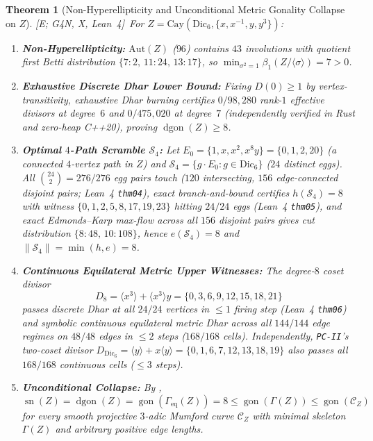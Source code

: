 \documentclass[11pt]{amsart}
\numberwithin{equation}{section}
\theoremstyle{plain}
\newtheorem{theorem}{Theorem}[section]
\theoremstyle{definition}\newtheorem{definition}[theorem]{Definition}
\theoremstyle{remark}\newtheorem{remark}[theorem]{Remark}
\newcommand{\calC}{\mathcal{C}}
\newcommand{\calS}{\mathcal{S}}
\newcommand{\Aut}{\mathrm{Aut}}
\newcommand{\Cay}{\mathrm{Cay}}
\newcommand{\Dic}{\mathrm{Dic}}
\newcommand{\gon}{\operatorname{gon}}
\newcommand{\dgon}{\operatorname{dgon}}
\newcommand{\sn}{\operatorname{sn}}
\newcommand{\ctag}[1]{\textup{\textsf{\scriptsize[#1]}}}
\begin{document}
\begin{theorem}[Non-Hyperellipticity and Unconditional Metric Gonality Collapse on $Z$]\label{thm:dic6_gonality}
\ctag{E; G4N, X, Lean~4}\ For $Z = \Cay(\Dic_6, \{x,x^{-1},y,y^3\})$:
\begin{enumerate}[label=(\arabic*),nosep]
\item \textbf{Non-Hyperellipticity:} $\Aut(Z)$ ($96$) contains $43$ involutions with quotient first Betti distribution $\{7:2,\,11:24,\,13:17\}$, so $\min_{\sigma^2=1}\beta_1(Z/\langle\sigma\rangle) = 7 > 0$.
\item \textbf{Exhaustive Discrete Dhar Lower Bound:} Fixing $D(0)\ge 1$ by vertex-transitivity, exhaustive Dhar burning certifies $0/98{,}280$ rank-$1$ effective divisors at degree~$6$ and $0/475{,}020$ at degree~$7$ (independently verified in Rust and zero-heap C++20), proving $\dgon(Z) \ge 8$.
\item \textbf{Optimal $4$-Path Scramble $\calS_4$:} Let $E_0 = \{1, x, x^2, x^8 y\} = \{0,1,2,20\}$ (a connected $4$-vertex path in $Z$) and $\calS_4 = \{g\cdot E_0 : g\in\Dic_6\}$ ($24$ distinct eggs). All $\binom{24}{2} = 276/276$ egg pairs touch ($120$ intersecting, $156$ edge-connected disjoint pairs; Lean~4 \texttt{thm04}), exact branch-and-bound certifies $h(\calS_4) = 8$ with witness $\{0,1,2,5,8,17,19,23\}$ hitting $24/24$ eggs (Lean~4 \texttt{thm05}), and exact Edmonds--Karp max-flow across all $156$ disjoint pairs gives cut distribution $\{8:48,\,10:108\}$, hence $e(\calS_4)=8$ and $\|\calS_4\| = \min(h,e) = 8$.
\item \textbf{Continuous Equilateral Metric Upper Witnesses:} The degree-$8$ coset divisor
\begin{equation}\label{eq:D8_witness}
D_8 = \langle x^3\rangle + \langle x^3\rangle y = \{0, 3, 6, 9, 12, 15, 18, 21\}
\end{equation}
passes discrete Dhar at all $24/24$ vertices in $\le 1$ firing step (Lean~4 \texttt{thm06}) and symbolic continuous equilateral metric Dhar across all $144/144$ edge regimes on $48/48$ edges in $\le 2$ steps ($168/168$ cells). Independently, \texttt{PC-II}'s two-coset divisor $D_{\Dic_6} = \langle y\rangle + x\langle y\rangle = \{0,1,6,7,12,13,18,19\}$ also passes all $168/168$ continuous cells ($\le 3$ steps).
\item \textbf{Unconditional Collapse:} By \cite{hjjs2022,baker2008,bpr2013},
\begin{equation}\label{eq:dic6_gon_collapse}
\sn(Z) = \dgon(Z) = \gon(\Gamma_{\mathrm{eq}}(Z)) = 8 \le \gon(\Gamma(Z)) \le \gon(\calC_Z)
\end{equation}
for every smooth projective $3$-adic Mumford curve $\calC_Z$ with minimal skeleton $\Gamma(Z)$ and arbitrary positive edge lengths.
\end{enumerate}
\end{theorem}
\end{document}

